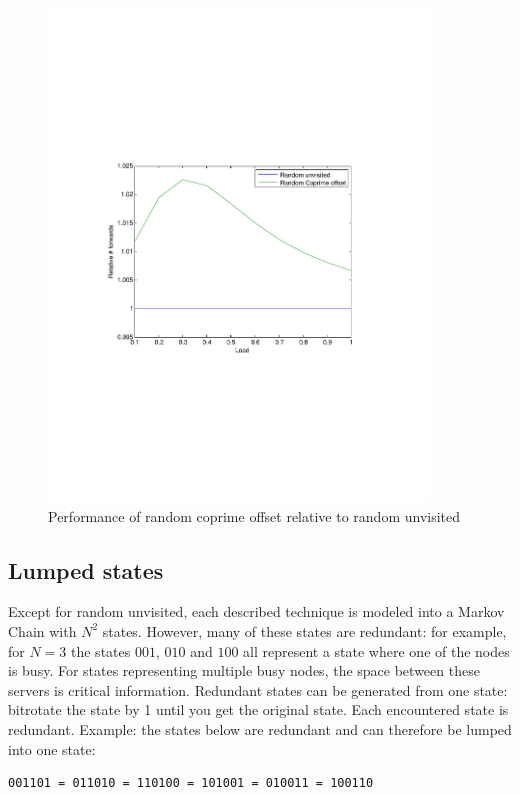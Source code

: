 \documentclass[10pt,a4paper]{article}
\begin{document}
\begin{figure}[h!tb]
\centering
\includegraphics[clip=true, trim=9em 24em 9em 24em, width=0.9\textwidth]{resources/plotrandunvisitedrandprime.pdf}
\caption{Performance of random coprime offset relative to random unvisited}
\label{figrurcpo}
\end{figure}

\subsection{Lumped states}
\label{lump}

Except for random unvisited, each described technique is modeled into a Markov Chain with $N^2$ states. However, many of these states are redundant: for example, for $N=3$ the states $001$, $010$ and $100$ all represent a state where one of the nodes is busy. For states representing multiple busy nodes, the space between these servers is critical information. Redundant states can be generated from one state: bitrotate the state by 1 until you get the original state. Each encountered state is redundant.
Example: the states below are redundant and can therefore be lumped into one state:
\begin{verbatim}
001101 = 011010 = 110100 = 101001 = 010011 = 100110
\end{verbatim}
\end{document}

